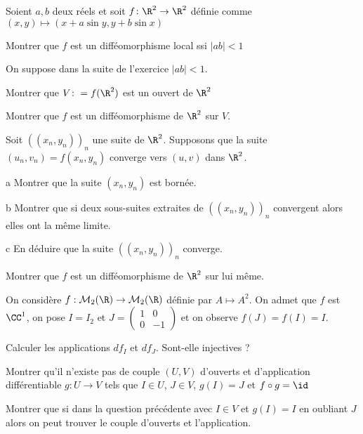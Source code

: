 \documentclass{report}
\begin{document}
\begin{exo}
    Soient \(a,b\) deux réels et soit \(f\colon\R^2\to\R^2\) définie comme
    \((x,y)\mapsto(x+a\sin y, y+ b\sin x)\)
    \begin{q}{1}
        Montrer que \(f\) est un difféomorphisme local ssi \(|ab|<1\)
    \end{q}
    On suppose dans la suite de l'exercice \(|ab|<1\).
    \begin{q}{2}
        Montrer que \(V\colon=f(\R^2)\) est un ouvert de \(\R^2\)
    \end{q}
    \begin{q}{3}
        Montrer que \(f\) est un difféomorphisme de \(\R^2\) sur \(V\).
    \end{q}
    \begin{q}{4}
        Soit \(((x_n,y_n))_n\) une suite de \(\R^2\). Supposons que la suite
        \((u_n,v_n)=f(x_n,y_n)\) converge vers \((u,v)\) dans \(\R^2\).
        \begin{q}{a}
            Montrer que la suite \((x_n,y_n)\) est bornée.
        \end{q}
        \begin{q}{b}
            Montrer que si deux sous-suites extraites de \(((x_n,y_n))_n\) convergent
            alors elles ont la même limite.
        \end{q}
        \begin{q}{c}
            En déduire que la suite \(((x_n,y_n))_n\) converge.
        \end{q}
    \end{q}
    \begin{q}{5}
        Montrer que \(f\) est un difféomorphisme de \(\R^2\) sur lui même.
    \end{q}
\end{exo}

\begin{exo}
    On considère \(f:\mathcal{M}_2(\R)\to\mathcal{M}_2(\R)\) définie par
    \(A\mapsto A^2\). On admet que \(f\) est \(\CC^1\), on pose \(I=I_2\) et
    \(J=\begin{pmatrix}1&0\\0&-1\end{pmatrix}\) et on observe \(f(J)=f(I)=I\).
    \begin{q}{1}
        Calculer les applications \(df_I\) et \(df_J\). Sont-elle injectives ?
    \end{q}
    \begin{q}{2}
        Montrer qu'il n'existe pas de couple \((U,V)\) d'ouverts et d'application
        différentiable \(g:U\to V\) tels que \(I\in U\), \(J\in V\), \(g(I)=J\) et \(f\circ g=\id\)
    \end{q}
    \begin{q}{3}
        Montrer que si dans la question précédente avec \(I\in V\) et \(g(I)=I\) en
        oubliant \(J\)alors on peut trouver le couple d'ouverts et l'application.
    \end{q}
\end{exo}
\end{document}
